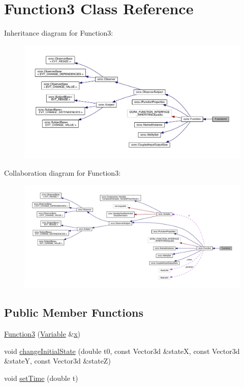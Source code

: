 \hypertarget{classFunction3}{}\section{Function3 Class Reference}
\label{classFunction3}


Inheritance diagram for Function3\+:\nopagebreak
\begin{figure}[H]
\begin{center}
\leavevmode
\includegraphics[width=350pt]{d0/dce/classFunction3__inherit__graph}
\end{center}
\end{figure}


Collaboration diagram for Function3\+:\nopagebreak
\begin{figure}[H]
\begin{center}
\leavevmode
\includegraphics[width=350pt]{df/d1b/classFunction3__coll__graph}
\end{center}
\end{figure}
\subsection*{Public Member Functions}
\begin{DoxyCompactItemize}
\item 
\hyperlink{classFunction3_a57fce7c38791ee3c72951a4d0ac510e5}{Function3} (\hyperlink{classocra_1_1Variable}{Variable} \&\hyperlink{classocra_1_1Function_a28825886d1f149c87b112ec2ec1dd486}{x})
\item 
void \hyperlink{classFunction3_a239a319d61236aa9b9375a595bf2beb9}{change\+Initial\+State} (double t0, const Vector3d \&stateX, const Vector3d \&stateY, const Vector3d \&stateZ)
\item 
void \hyperlink{classFunction3_ade56597de44f5cdd047aa9aa9e29a129}{set\+Time} (double t)
\end{DoxyCompactItemize}
